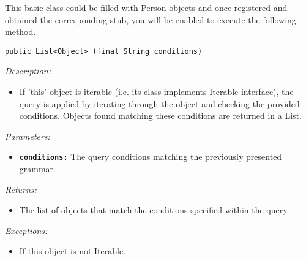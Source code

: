This basic class could be filled with Person objects and once registered and obtained the corresponding stub, you will be enabled to execute the following method.

\begin{dBox}
\texttt{public List<Object> (final String conditions)}
\LINE

{\it Description:}

\begin{itemize}
  \item If 'this' object is iterable (i.e. its class implements Iterable interface), the query is applied by iterating through the object and checking the provided conditions. Objects found matching these conditions are returned in a List.
\end{itemize}

{\it Parameters:}

\begin{itemize}
  \item \texttt{\bfseries conditions:} The query conditions matching the previously presented grammar.
\end{itemize}
 
{\it Returns:}

\begin{itemize}
  \item The list of objects that match the conditions specified within the query.
\end{itemize}

{\it Exceptions:}

\begin{itemize}
  \item If this object is not Iterable.
\end{itemize}

\end{dBox}